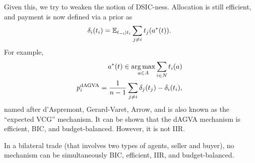 		Given this, we try to weaken the notion of DSIC-ness. Allocation is still efficient, and payment is now defined via a prior as
		\[ \delta_i(t_i) = \mathbb{E}_{t_{-i} \mid t_i} \sum_{j \ne i} t_j(a^*(t)). \]
		For example,
		\begin{align*}
			a^*(t) \in \operatorname*{arg\,max}_{a \in A} \sum_{i \in N} t_i(a) \\
			p_i^\text{dAGVA} = \frac{1}{n-1} \sum_{j \ne i} \delta_j(t_j) - \delta_i(t_i),
		\end{align*}
		named after d'Aspremont, Gerard-Varet, Arrow, and is also known as the ``expected VCG'' mechanism. It can be shown that the dAGVA mechanism is efficient, BIC, and budget-balanced. However, it is not IIR.

		\begin{ftheo}
			In a bilateral trade (that involves two types of agents, seller and buyer), no mechanism can be simultaneously BIC, efficient, IIR, and budget-balanced.
		\end{ftheo}